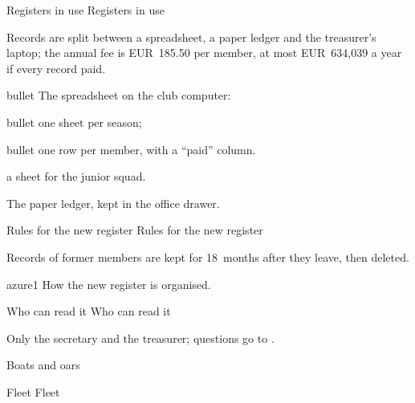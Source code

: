 \documentclass[a4paper,11pt]{article}
\begin{document}
{Registers in use}
{Registers in use}

 Records are split between a spreadsheet, a paper ledger
and the treasurer’s laptop; the annual fee is EUR~185.50 per member, at most EUR~634,039
a year if every record paid.
\par
\begin{RdList}{bullet}
\RdItem The spreadsheet on the club computer:
\begin{RdList}{bullet}
\RdItem one sheet per season;
\begin{RdList}{bullet}
\RdItem one row per member, with a “paid” column.
\end{RdList}
\RdItem a sheet for the junior squad.
\end{RdList}
\RdItem The paper ledger, kept in the office drawer.
\end{RdList}

{Rules for the new register}
{Rules for the new register}

Records of former members are kept for 18~months after they leave, then deleted.
\par
\begin{RdDiagram}{azure}{1}
{How the new register is organised.}
\end{RdDiagram}

{Who can read it}
{Who can read it}

Only the secretary and the treasurer; questions go to .
\par

{Boats and oars}

{Fleet}
{Fleet}
\end{document}
